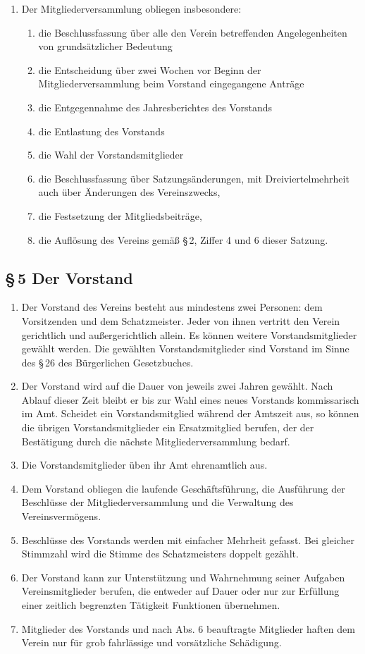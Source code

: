 \documentclass[12pt,a4paper]{article}
\begin{document}
\begin{enumerate}
\item Der Mitgliederversammlung obliegen insbesondere:
\begin{enumerate}
\item die Beschlussfassung über alle den Verein betreffenden Angelegenheiten von grundsätzlicher Bedeutung
\item die Entscheidung über zwei Wochen vor Beginn der Mitgliederversammlung beim Vorstand eingegangene Anträge
\item die Entgegennahme des Jahresberichtes des Vorstands
\item die Entlastung des Vorstands
\item die Wahl der Vorstandsmitglieder
\item die Beschlussfassung über Satzungsänderungen, mit Dreiviertelmehrheit auch über Änderungen des Vereinszwecks,
\item die Festsetzung der Mitgliedsbeiträge,
\item die Auflösung des Vereins gemäß §\,2, Ziffer 4 und 6 dieser Satzung.
\end{enumerate}
\end{enumerate}
\subsection*{§\,5 Der Vorstand}
\begin{enumerate}
\item Der Vorstand des Vereins besteht aus mindestens zwei Personen: dem Vorsitzenden und dem Schatzmeister. Jeder von ihnen vertritt den Verein gericht\-lich und außergerichtlich allein. Es können weitere Vorstandsmitglieder gewählt werden. Die gewählten Vorstandsmitglieder sind Vorstand im Sinne des §\,26 des Bürgerlichen Gesetzbuches.
\item Der Vorstand wird auf die Dauer von jeweils zwei Jahren gewählt. Nach Ablauf dieser Zeit bleibt er bis zur Wahl eines neues Vorstands kommissarisch im Amt. Scheidet ein Vorstandsmitglied während der Amtszeit aus, so können die übrigen Vorstandsmitglieder ein Ersatzmitglied berufen, der der Bestätigung durch die nächste Mitgliederversammlung bedarf.
\item Die Vorstandsmitglieder üben ihr Amt ehrenamtlich aus.
\item Dem Vorstand obliegen die laufende Geschäftsführung, die Ausführung der Beschlüsse der Mitgliederversammlung und die Verwaltung des Vereinsvermögens.
\item Beschlüsse des Vorstands werden mit einfacher Mehrheit gefasst. Bei gleicher Stimmzahl wird die Stimme des Schatzmeisters doppelt gezählt.
\item Der Vorstand kann zur Unterstützung und Wahrnehmung seiner Aufgaben Vereinsmitglieder berufen, die entweder auf Dauer oder nur zur Erfüllung einer zeitlich begrenzten Tätigkeit Funktionen übernehmen.
\item Mitglieder des Vorstands und nach Abs. 6 beauftragte Mitglieder haften dem Verein nur für grob fahrlässige und vorsätzliche Schädigung. 
\end{enumerate}
\end{document}

